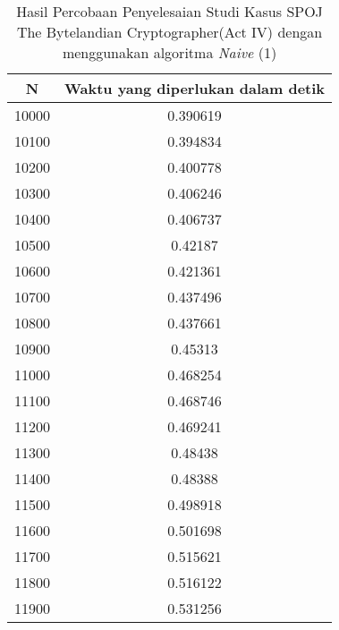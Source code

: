 \begin{table}[H]
\centering
\begin{tabular}{|c|c|}\hline
N&Waktu yang diperlukan dalam detik\\ \hline
10000&0.390619\\ \hline
10100&0.394834\\ \hline
10200&0.400778\\ \hline
10300&0.406246\\ \hline
10400&0.406737\\ \hline
10500&0.42187\\ \hline
10600&0.421361\\ \hline
10700&0.437496\\ \hline
10800&0.437661\\ \hline
10900&0.45313\\ \hline
11000&0.468254\\ \hline
11100&0.468746\\ \hline
11200&0.469241\\ \hline
11300&0.48438\\ \hline
11400&0.48388\\ \hline
11500&0.498918\\ \hline
11600&0.501698\\ \hline
11700&0.515621\\ \hline
11800&0.516122\\ \hline
11900&0.531256\\ \hline
\end{tabular}
\caption {Hasil Percobaan Penyelesaian Studi Kasus SPOJ The Bytelandian Cryptographer(Act IV) dengan menggunakan algoritma \textit{Naive} (1)}
\label{tab1:1res2}
\end{table}
